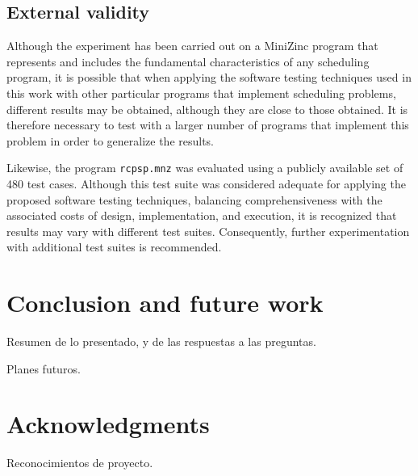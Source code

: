 \subsection{External validity}

Although the experiment has been carried out on a MiniZinc program that represents and includes the fundamental characteristics of any scheduling program, it is possible that when applying the software testing techniques used in this work with other particular programs that implement scheduling problems, different results may be obtained, although they are close to those obtained. It is therefore necessary to test with a larger number of programs that implement this problem in order to generalize the results. 

Likewise, the program \texttt{rcpsp.mnz} was evaluated using a publicly available set of 480 test cases. Although this test suite was considered adequate for applying the proposed software testing techniques, balancing comprehensiveness with the associated costs of design, implementation, and execution, it is recognized that results may vary with different test suites. Consequently, further experimentation with additional test suites is recommended.


\section{Conclusion and future work}
\label{sec:conclusion}


Resumen de lo presentado, y de las respuestas a las preguntas.

Planes futuros.

\section*{Acknowledgments}

Reconocimientos de proyecto.



\appendix



